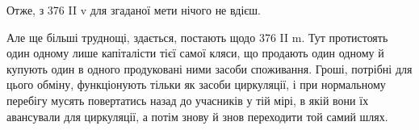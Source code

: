 Отже, з 376 II v для згаданої мети нічого не вдієш.

Але ще більші труднощі, здається, постають щодо 376 II m. Тут протистоять
один одному лише капіталісти тієї самої кляси, що продають
один одному й купують один в одного продуковані ними засоби споживання.
Гроші, потрібні для цього обміну, функціонують тільки як засоби
циркуляції, і при нормальному перебігу мусять повертатись назад
до учасників у тій мірі, в якій вони їх авансували для циркуляції, а потім
знову й знов переходити той самий шлях.
